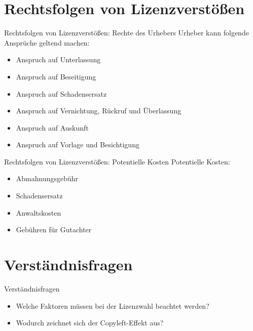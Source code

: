 \documentclass{beamer}
\begin{document}
\section{Rechtsfolgen von Lizenzverstößen}
\begin{frame}{Rechtsfolgen von Lizenzverstößen: Rechte des Urhebers}
	Urheber kann folgende Ansprüche geltend machen:
	\begin{itemize}
		\item Anspruch auf Unterlassung
		\item Anspruch auf Beseitigung
		\item Anspruch auf Schadensersatz 
		\item Anspruch auf Vernichtung, Rückruf und Überlassung
		\item Anspruch auf Auskunft
		\item Anspruch auf Vorlage und Besichtigung
	\end{itemize}
\end{frame}

\begin{frame}{Rechtsfolgen von Lizenzverstößen: Potentielle Kosten}
	Potentielle Kosten:
	\begin{itemize}
		\item Abmahnungsgebühr
		\item Schadensersatz
		\item Anwaltskosten
		\item Gebühren für Gutachter
	\end{itemize}
\end{frame}

\section{Verständnisfragen}
\begin{frame}{Verständnisfragen}
	\begin{itemize}
		\item Welche Faktoren müssen bei der Lizenzwahl beachtet werden?
		\item Wodurch zeichnet sich der Copyleft-Effekt aus?
	\end{itemize}
\end{frame}
\end{document}
